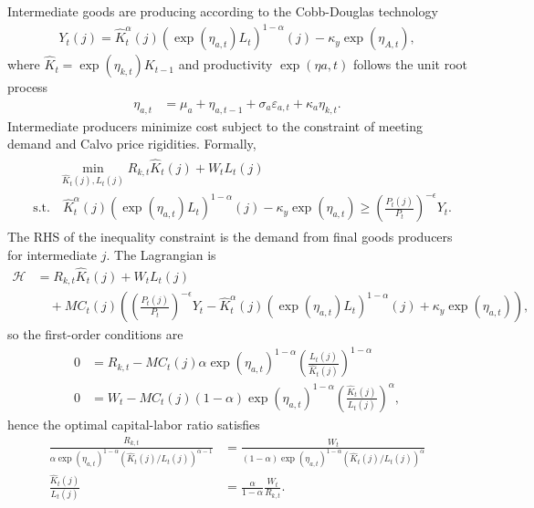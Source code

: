 \documentclass[12 pt, oneside]{article}
\theoremstyle{definition}
\theoremstyle{definition}
\theoremstyle{definition}
\newcommand{\calH}{\mathcal{H}}
\begin{document}
Intermediate goods are producing according to the Cobb-Douglas technology
\begin{align}\label{eq:intermediate goods production function}
  Y_t(j) =  \hat{K}_t^\alpha(j)(\exp(\eta_{a, t})L_t)^{1 - \alpha}(j) - \kappa_y\exp(\eta_{A, t}),
\end{align}
where $\hat{K}_t = \exp(\eta_{k, t})K_{t - 1}$ and productivity $\exp(\eta{a, t})$ follows the unit root process
\begin{align}\label{eq:productivity process}
  \eta_{a, t} & = \mu_a + \eta_{a, t - 1} + \sigma_a \varepsilon_{a, t} + \kappa_a\eta_{k, t}.
\end{align}
Intermediate producers minimize cost subject to the constraint of meeting demand and Calvo price rigidities. Formally,
\begin{align}
  \begin{split}
    & \quad\quad\min_{\hat{K}_t(j), L_t(j)} R_{k, t} \hat{K}_t(j) + W_t L_t(j)\\
    &\text{s.t.}\quad  \hat{K}_t^\alpha(j) (\exp(\eta_{a, t})L_t)^{1 - \alpha}(j) - \kappa_y\exp(\eta_{a, t}) \geq \left(\frac{P_t(j)}{P_t}\right)^{-\epsilon}Y_t.
  \end{split}
\end{align}
The RHS of the inequality constraint is the demand from final goods producers for intermediate $j$. The Lagrangian is
\begin{align*}
  \calH & = R_{k, t} \hat{K}_t(j) + W_t L_t(j)\\
        &\quad +  MC_t(j)\left(\left(\frac{P_t(j)}{P_t}\right)^{-\epsilon}Y_t - \hat{K}_t^\alpha(j) (\exp(\eta_{a, t})L_t)^{1 - \alpha}(j) + \kappa_y\exp(\eta_{a, t})\right),
\end{align*}
so the first-order conditions are
\begin{align*}
  0 & = R_{k, t} - MC_t(j) \alpha \exp(\eta_{a, t})^{1 - \alpha} \left(\frac{L_t(j)}{\hat{K}_t(j)}\right)^{1 - \alpha}\\
  0 & = W_t - MC_t(j) (1-\alpha) \exp(\eta_{a, t})^{1 - \alpha}  \left(\frac{\hat{K}_t(j)}{L_t(j)}\right)^{\alpha},
\end{align*}
hence the optimal capital-labor ratio satisfies
\begin{align*}
  \frac{R_{k, t}}{\alpha \exp(\eta_{a, t})^{1 - \alpha}(\hat{K}_t(j)/L_t(j))^{\alpha - 1}} & = \frac{W_t}{(1-\alpha) \exp(\eta_{a, t})^{1 - \alpha}(\hat{K}_t(j)/L_t(j))^{ \alpha}}\\
  \frac{\hat{K}_t(j)}{L_t(j)} & =\frac{\alpha}{1 - \alpha} \frac{W_t}{R_{k, t}}.
\end{align*}
\end{document}
